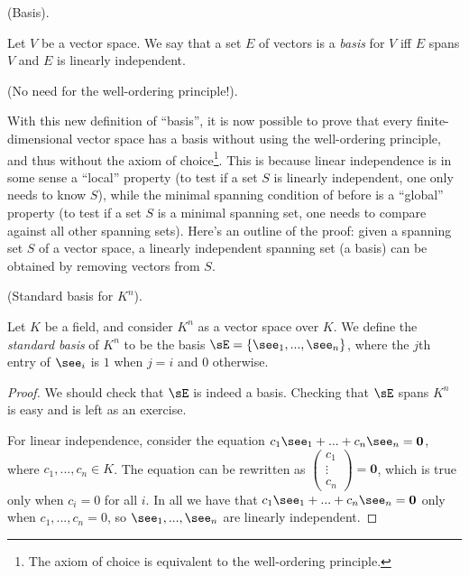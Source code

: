 \begin{defn}
    (Basis).
    
    Let $V$ be a vector space. We say that a set $E$ of vectors is a \textit{basis} for $V$ iff $E$ spans $V$ and $E$ is linearly independent.
\end{defn}

\begin{remark}
    (No need for the well-ordering principle!).

    With this new definition of ``basis'', it is now possible to prove that every finite-dimensional vector space has a basis without using the well-ordering principle, and thus without the axiom of choice\footnote{The axiom of choice is equivalent to the well-ordering principle.}. This is because linear independence is in some sense a ``local'' property (to test if a set $S$ is linearly independent, one only needs to know $S$), while the minimal spanning condition of before is a ``global'' property (to test if a set $S$ is a minimal spanning set, one needs to compare against all other spanning sets). Here's an outline of the proof: given a spanning set $S$ of a vector space, a linearly independent spanning set (a basis) can be obtained by removing vectors from $S$.
\end{remark}

\begin{defn}
    (Standard basis for $K^n$).
    
    Let $K$ be a field, and consider $K^n$ as a vector space over $K$. We define the \textit{standard basis} of $K^n$ to be the basis $\sE = \{\see_1, ..., \see_n\}$, where the $j$th entry of $\see_i$ is $1$ when $j = i$ and $0$ otherwise.
\end{defn}

\begin{proof}
   We should check that $\sE$ is indeed a basis. Checking that $\sE$ spans $K^n$ is easy and is left as an exercise.
   
   For linear independence, consider the equation $c_1 \see_1 + ... + c_n \see_n = \mathbf{0}$, where $c_1, ..., c_n \in K$. The equation can be rewritten as $\begin{pmatrix} c_1 \\ \vdots \\ c_n \end{pmatrix} = \mathbf{0}$, which is true only when $c_i = 0$ for all $i$. In all we have that $c_1 \see_1 + ... + c_n \see_n = \mathbf{0}$ only when $c_1, ..., c_n = 0$, so $\see_1, ..., \see_n$ are linearly independent.
\end{proof}

